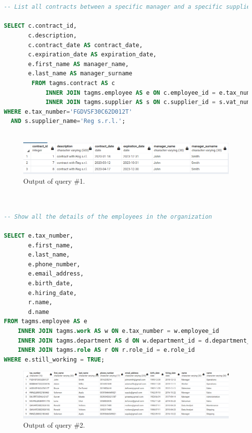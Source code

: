 \begin{lstlisting}[language=SQL,
keywordstyle=\color{blue},
stringstyle=\color{mauve},
showstringspaces=false,
breaklines=true,
basicstyle=\ttfamily\footnotesize]


-- List all contracts between a specific manager and a specific supplier.

SELECT c.contract_id,
       c.description,
       c.contract_date AS contract_date,
       c.expiration_date AS expiration_date,
       e.first_name AS manager_name,
       e.last_name AS manager_surname
		FROM tagms.contract AS c
		    INNER JOIN tagms.employee AS e ON c.employee_id = e.tax_number
		    INNER JOIN tagms.supplier AS s ON c.supplier_id = s.vat_number
WHERE e.tax_number='FGDVSF30C62D012T'
  AND s.supplier_name='Reg s.r.l.';
  
\end{lstlisting}

\begin{figure}[h!]
	\centering
	\includegraphics[width=\linewidth]{images/q1}
	\caption{Output of query \#1.}
	\label{fig:q1}
\end{figure}



\begin{lstlisting}[language=SQL,
	keywordstyle=\color{blue},
	stringstyle=\color{mauve},
	showstringspaces=false,
	breaklines=true,
	basicstyle=\ttfamily\footnotesize]


-- Show all the details of the employees in the organization

SELECT e.tax_number,
       e.first_name,
       e.last_name,
       e.phone_number,
       e.email_address,
       e.birth_date,
       e.hiring_date,
       r.name,
       d.name
FROM tagms.employee AS e
    INNER JOIN tagms.work AS w ON e.tax_number = w.employee_id
    INNER JOIN tagms.department AS d ON w.department_id = d.department_id
    INNER JOIN tagms.role AS r ON r.role_id = e.role_id
WHERE e.still_working = TRUE;

\end{lstlisting}

\begin{figure}[h!]
	\centering
	\includegraphics[width=\linewidth]{images/q2}
	\caption{Output of query \#2.}
	\label{fig:q2}
\end{figure}

